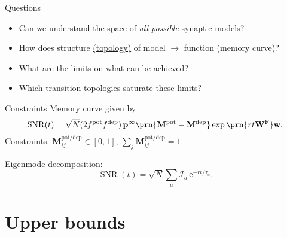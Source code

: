 \documentclass{beamer}%
\DeclareMathOperator{\snr}{SNR}
\newcommand{\pr}{\mathbf{p}}
\newcommand{\eq}{\pr^\infty}
\newcommand{\w}{\mathbf{w}}
\newcommand{\W}{\mathbf{W}}
\newcommand{\frg}{\W^\mathrm{F}}
\newcommand{\M}{\mathbf{M}}
\newcommand{\pot}{^{\text{pot}}}
\newcommand{\dep}{^{\text{dep}}}
\newcommand{\potdep}{^{\text{pot/dep}}}
\newcommand{\initial}{\mathcal{I}}
\renewcommand{\e}{\mathsf{e}}
\begin{document}

\begin{frame}[label=fr_questions]{Questions}
%
 \begin{itemize}
   \item Can we understand the space of \emph{all possible} synaptic models?
   \item How does structure \hyperlink{fr_net<1>}{(topology)} of model $\to$ function (memory curve)?
   \item What are the limits on what can be achieved?
   \item Which transition topologies saturate these limits?
 \end{itemize}
%
\end{frame}


\begin{frame}{Constraints}
%
 Memory curve given by
 \begin{equation*}
   \snr(t) = 
      \sqrt{N}(2f\pot f\dep)\,
      \eq \prn{\M\pot-\M\dep}      \exp\prn{rt\frg}\w.
 \end{equation*}
 Constraints: \qquad $\M\potdep_{ij}\in[0,1]$, \qquad $\sum_j\M\potdep_{ij}=1$.

 \vp Eigenmode decomposition:
 \begin{equation*}
   \snr(t) = \sqrt{N}\sum_a \initial_a \,\e^{-rt/\tau_a}.
 \end{equation*}
%
\end{frame}



\section{Upper bounds}

\end{document}

